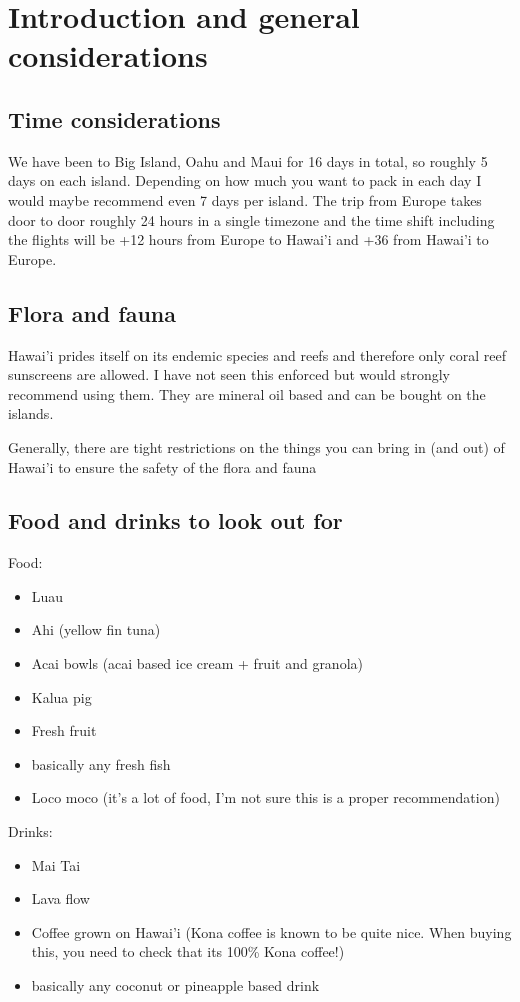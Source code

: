 \documentclass[11pt,a4paper,sans,english]{article}
\begin{document}
\section{Introduction and general considerations}
\subsection{Time considerations}
We have been to Big Island, Oahu and Maui for 16 days in total, so roughly 5 days on each island. Depending on how much you want to pack in each day I would maybe recommend even 7 days per island. The trip from Europe takes door to door roughly 24 hours in a single timezone and the time shift including the flights will be +12 hours from Europe to Hawai'i and +36 from Hawai'i to Europe. 
\subsection{Flora and fauna}
Hawai'i prides itself on its endemic species and reefs and therefore only coral reef sunscreens are allowed. I have not seen this enforced but would strongly recommend using them. They are mineral oil based and can be bought on the islands.

Generally, there are tight restrictions on the things you can bring in (and out) of Hawai'i to ensure the safety of the flora and fauna
\subsection{Food and drinks to look out for}
Food:
\begin{itemize}
	\itemsep-0.5em 
	\item Luau
	\item Ahi (yellow fin tuna)
	\item Acai bowls (acai based ice cream + fruit and granola)
	\item Kalua pig
	\item Fresh fruit
	\item basically any fresh fish
	\item Loco moco (it's a lot of food, I'm not sure this is a proper recommendation)
\end{itemize}
Drinks:
\begin{itemize}
	\itemsep-0.5em 
	\item Mai Tai
	\item Lava flow
	\item Coffee grown on Hawai'i (Kona coffee is known to be quite nice. When buying this, you need to check that its 100\% Kona coffee!)
	\item basically any coconut or pineapple based drink
\end{itemize}
\end{document}
